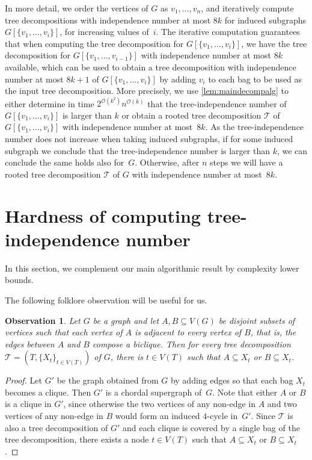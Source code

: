 \documentclass[11pt]{article}
\newtheorem{observation}{Observation}[section]
\theoremstyle{definition}
\newcommand{\td}{\mathcal{T}}
\newcommand{\OO}{\mathcal{O}}
\begin{document}
In more detail, we order the vertices of $G$ as $v_1, \ldots, v_n$, and iteratively compute tree decompositions with independence number at most $8k$ for induced subgraphs $G[\{v_1, \ldots, v_i\}]$, for increasing values of~$i$.
The iterative computation guarantees that when computing the tree decomposition for $G[\{v_1, \ldots, v_i\}]$, we have the tree decomposition for $G[\{v_1, \ldots, v_{i-1}\}]$ with independence number at most $8k$ available, which can be used to obtain a tree decomposition with independence number at most $8k+1$ of $G[\{v_1, \ldots, v_i\}]$ by adding $v_i$ to each bag to be used as the input tree decomposition.
More precisely, we use \cref{lem:maindecompalg} to either determine in time $2^{\OO(k^2)} n^{\OO(k)}$ that the tree-independence number of $G[\{v_1, \ldots, v_i\}]$ is larger than $k$ or obtain a rooted tree decomposition $\td$ of $G[\{v_1, \ldots, v_i\}]$ with independence number at most~$8k$.
As the tree-independence number does not increase when taking induced subgraphs, if for some induced subgraph we conclude that the tree-independence number is larger than $k$, we can conclude the same holds also for~$G$.
Otherwise, after $n$ steps we will have a rooted tree decomposition $\td$ of $G$ with independence number at most~$8k$.

\section{Hardness of computing tree-independence number}
\label{sec:lower-bound}

In this section, we complement our main algorithmic result by complexity lower bounds.

The following folklore observation will be useful for us.

\begin{observation}\label{obs:folk}
Let $G$ be a graph and let $A,B\subseteq V(G)$ be disjoint subsets of vertices such that each vertex of $A$ is adjacent to every vertex of $B$, that is, the edges between $A$ and $B$ compose a biclique.
Then for every tree decomposition  $\mathcal{T} = (T, \{X_t\}_{t\in V(T)})$ of  $G$, there is $t\in V(T)$ such that $A\subseteq X_t$ or $B\subseteq X_t$.
\end{observation}

\begin{proof}
Let $G'$ be the graph obtained from $G$ by adding edges so that each bag $X_t$ becomes a clique.
Then $G'$ is a chordal supergraph of~$G$.
Note that either $A$ or $B$ is a clique in $G'$, since otherwise the two vertices of any non-edge in $A$ and two vertices of any non-edge in $B$ would form an induced $4$-cycle in~$G'$.
Since $\mathcal{T}$ is also a tree decomposition of $G'$ and each clique is covered by a single bag of the tree decomposition, there exists a node $t\in V(T)$ such that $A\subseteq X_t$ or $B\subseteq X_t$.
\end{proof}
\end{document}
